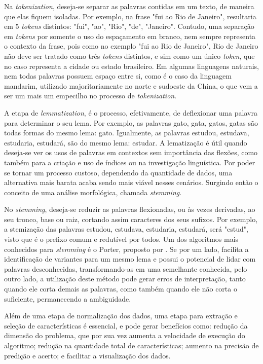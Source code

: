 Na \textit{tokenization}, deseja-se separar as palavras contidas em um texto, de maneira que elas fiquem isoladas. Por exemplo, na frase "fui ao Rio de Janeiro", resultaria em 5 \textit{tokens} distintos: "fui", "ao", "Rio", "de", "Janeiro". Contudo, uma separação em \textit{tokens} por somente o uso do espaçamento em branco, nem sempre representa o contexto da frase, pois como no exemplo "fui ao Rio de Janeiro", Rio de Janeiro não deve ser tratado como três \textit{tokens} distintos, e sim como um único \textit{token}, que no caso representa a cidade ou estado brasileiro. Em algumas linguagens naturais, nem todas palavras possuem espaço entre si, como é o caso da linguagem mandarim, utilizado majoritariamente no norte e sudoeste da China, o que vem a ser um mais um empecilho no processo de \textit{tokenization}. 

A etapa de \textit{lemmatization}, é o processo, efetivamente, de deflexionar uma palavra para determinar o seu lema. Por exemplo, as palavras gato, gata, gatos, gatas são todas formas do mesmo lema: gato. Igualmente, as palavras estudou, estudava, estudaria, estudará, são do mesmo lema: estudar. A lematização é útil quando deseja-se ver os usos de palavras em contextos sem importância das flexões, como também para a criação e uso de índices ou na investigação linguística. Por poder se tornar um processo custoso, dependendo da quantidade de dados, uma alternativa mais barata acaba sendo mais viável nesses cenários. Surgindo então o conceito de uma análise morfológica, chamada \textit{stemming}.

No \textit{stemming}, deseja-se reduzir as palavras flexionadas, ou às vezes derivadas, ao seu tronco, base ou raiz, cortando assim caracteres dos seus sufixos. Por exemplo, a stemização das palavras estudou, estudava, estudaria, estudará, será "estud", visto que é o prefixo comum e redutível por todos. Um dos algoritmos mais conhecidos para \textit{stemming} é o Porter, proposto por \citep{porter1980algorithm}. Se por um lado, facilita a identificação de variantes para um mesmo lema e possui o potencial de lidar com palavras desconhecidas, transformando-as em uma semelhante conhecida, pelo outro lado, a utilização deste método pode gerar erros de interpretação, tanto quando ele corta demais as palavras, como também quando ele não corta o suficiente, permanecendo a ambiguidade.

Além de uma etapa de normalização dos dados, uma etapa para extração e seleção de características é essencial, e pode gerar benefícios como: redução da dimensão do problema, que por sua vez aumenta a velocidade de execução do algoritmo; redução na quantidade total de características; aumento na precisão de predição e acerto; e facilitar a visualização dos dados.

